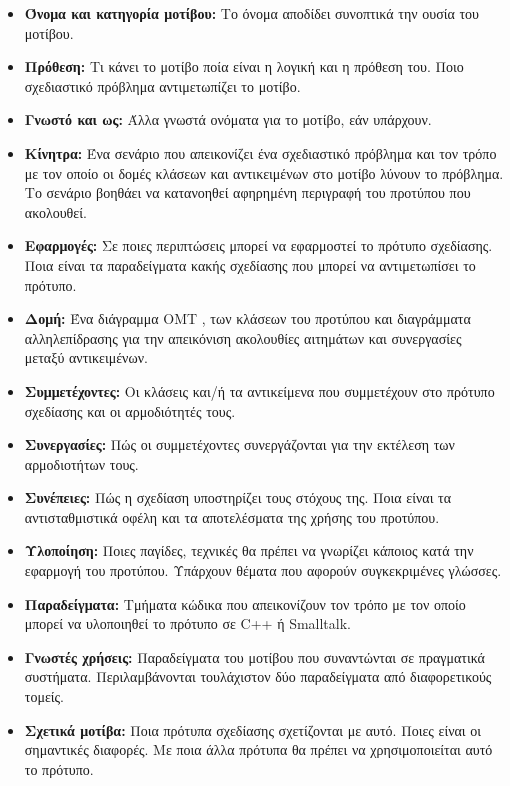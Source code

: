 \begin{itemize}
    \item \textbf{Όνομα και κατηγορία μοτίβου:} Το όνομα αποδίδει συνοπτικά την ουσία του μοτίβου.
    \item \textbf{Πρόθεση:} Τι κάνει το μοτίβο ποία είναι η λογική και η πρόθεση του. Ποιο σχεδιαστικό πρόβλημα αντιμετωπίζει το μοτίβο.
    \item \textbf{Γνωστό και ως:} Άλλα γνωστά ονόματα για το μοτίβο, εάν υπάρχουν.
    \item \textbf{Κίνητρα:} Ένα σενάριο που απεικονίζει ένα σχεδιαστικό πρόβλημα και τον τρόπο με τον οποίο οι
    δομές κλάσεων και αντικειμένων στο μοτίβο λύνουν το πρόβλημα. Το σενάριο βοηθάει να κατανοηθεί
    αφηρημένη περιγραφή του προτύπου που ακολουθεί.
    \item \textbf{Εφαρμογές:} Σε ποιες περιπτώσεις μπορεί να εφαρμοστεί το πρότυπο σχεδίασης. Ποια είναι
    τα παραδείγματα κακής σχεδίασης που μπορεί να αντιμετωπίσει το πρότυπο.
    \item \textbf{Δομή:} Ένα διάγραμμα OMT \cite{citeulike:348271}, των κλάσεων του 
    προτύπου και διαγράμματα αλληλεπίδρασης \cite{jacobson92usecase} για την απεικόνιση ακολουθίες αιτημάτων και συνεργασίες μεταξύ αντικειμένων.
    \item \textbf{Συμμετέχοντες:} Οι κλάσεις και/ή τα αντικείμενα που συμμετέχουν στο πρότυπο σχεδίασης και οι
    αρμοδιότητές τους.
    \item \textbf{Συνεργασίες:} Πώς οι συμμετέχοντες συνεργάζονται για την εκτέλεση των αρμοδιοτήτων τους.
    \item \textbf{Συνέπειες:} Πώς η σχεδίαση υποστηρίζει τους στόχους της. Ποια είναι τα αντισταθμιστικά οφέλη και τα αποτελέσματα της 
    χρήσης του προτύπου.
    \item \textbf{Υλοποίηση:} Ποιες παγίδες, τεχνικές θα πρέπει να γνωρίζει κάποιος κατά την εφαρμογή
    του προτύπου. Υπάρχουν θέματα που αφορούν συγκεκριμένες γλώσσες.
    \item \textbf{Παραδείγματα:} Τμήματα κώδικα που απεικονίζουν τον τρόπο με τον οποίο μπορεί να υλοποιηθεί
    το πρότυπο σε C++ ή Smalltalk.
    \item \textbf{Γνωστές χρήσεις:} Παραδείγματα του μοτίβου που συναντώνται σε πραγματικά συστήματα. Περιλαμβάνονται τουλάχιστον 
    δύο παραδείγματα από διαφορετικούς τομείς.
    \item \textbf{Σχετικά μοτίβα:} Ποια πρότυπα σχεδίασης σχετίζονται με αυτό. Ποιες είναι οι σημαντικές
    διαφορές. Με ποια άλλα πρότυπα θα πρέπει να χρησιμοποιείται αυτό το πρότυπο.
\end{itemize}
